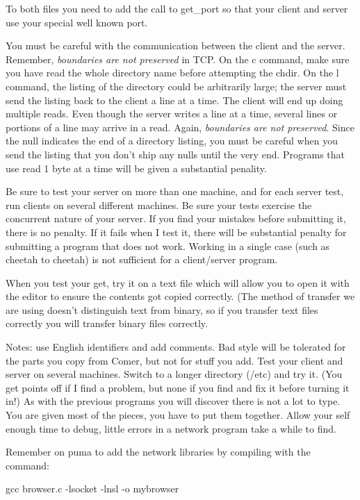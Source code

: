 To both files you need to add the call to {\ltt{}get_port} so that
your client and server use your special well known port.

You must be careful with the communication between the client and the server.
Remember, {\it boundaries are not preserved} in TCP.
On the {\ltt{}c} command, make sure you have read the whole directory name
before attempting the {\ltt{}chdir}.
On the {\ltt{}l} command, the listing of the directory could be arbitrarily
large; the server must send the listing back to the client a line at a time.
The client will end up doing multiple reads. 
Even though the server writes a line at a time, several lines or portions
of a line may arrive in a read.
Again, {\it boundaries are not preserved}.
Since the null indicates the end of a directory listing,
you must be careful when you send the listing 
that you don't ship any nulls until the very end.
Programs that use read 1 byte at a time will be given a substantial penality.


Be sure to test your server on more than one machine, and
for each server test, run clients on several different machines.
Be sure your tests exercise the concurrent nature of your server.
If you find your mistakes before submitting it, there is no penalty.
If it fails when I test it, there will be substantial penalty for
submitting a program that does not work.
Working in a single case (such as cheetah to cheetah) is not sufficient
for a client/server program.

When you test your get, try it on a text file which will allow you
to open it with the editor to ensure the contents got copied
correctly. (The method of transfer we are using doesn't distinguish
text from binary, so if you transfer text files correctly you will
transfer binary files correctly.

Notes: use English identifiers and add comments.
Bad style will be tolerated for the parts you copy from Comer,
but not for stuff you add.
Test your client and server on several machines.
Switch to a longer directory ({\ltt{}/etc}) and try it.
(You get points off if I find a problem,
but none if you find and fix it before turning it in!)
As with the previous programs you will discover there is not a lot to type.
You are given most of the pieces,
you have to put them together.
Allow your self enough time to debug,
little errors in a network program take a while to find.

Remember on {\ltt{}puma} to
add the network libraries by compiling with the command:

{\ltt{}gcc browser.c -lsocket -lnsl -o mybrowser}
\bye
